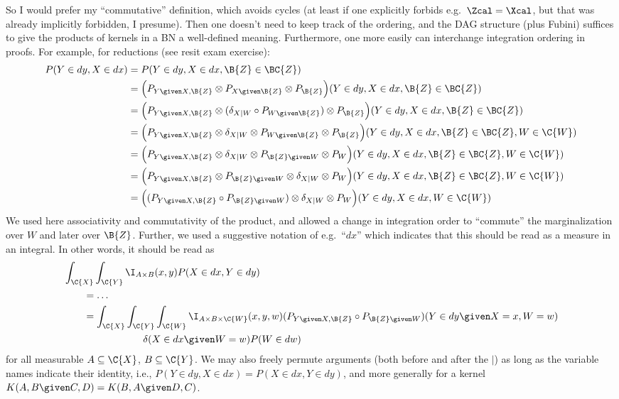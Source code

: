 So I would prefer my ``commutative'' definition, which avoids cycles (at least if one explicitly forbids e.g.\ $\Zcal = \Xcal$, but that was already implicitly forbidden, I presume).
Then one doesn't need to keep track of the ordering, and the DAG structure (plus Fubini) suffices to give the products of kernels in a BN a well-defined meaning.
Furthermore, one more easily can interchange integration ordering in proofs. For example, for reductions (see resit exam exercise):
\begin{align*}
  P(Y \in dy, X \in dx) 
  &= P(Y \in dy, X \in dx, \B{Z} \in \BC{Z}) \\
  &= \Big(P_{Y\given X,\B{Z}} \otimes P_{X\given \B{Z}} \otimes P_{\B{Z}}\Big)(Y \in dy, X \in dx, \B{Z} \in \BC{Z}) \\
  &= \Big(P_{Y\given X,\B{Z}} \otimes (\delta_{X|W} \circ P_{W\given\B{Z}}) \otimes P_{\B{Z}}\Big)(Y \in dy, X \in dx, \B{Z} \in \BC{Z}) \\
  &= \Big(P_{Y\given X,\B{Z}} \otimes \delta_{X|W} \otimes P_{W\given\B{Z}} \otimes P_{\B{Z}}\Big)(Y \in dy, X \in dx, \B{Z} \in \BC{Z}, W \in \C{W}) \\
  &= \Big(P_{Y\given X,\B{Z}} \otimes \delta_{X|W} \otimes P_{\B{Z}\given W} \otimes P_{W}\Big)(Y \in dy, X \in dx, \B{Z} \in \BC{Z}, W \in \C{W}) \\
  &= \Big(P_{Y\given X,\B{Z}} \otimes P_{\B{Z}\given W} \otimes \delta_{X|W} \otimes P_{W}\Big)(Y \in dy, X \in dx, \B{Z} \in \BC{Z}, W \in \C{W}) \\
  &= \Big((P_{Y\given X,\B{Z}} \circ P_{\B{Z}\given W}) \otimes \delta_{X|W} \otimes P_{W}\Big)(Y \in dy, X \in dx, W \in \C{W})
\end{align*}
We used here associativity and commutativity of the product, and allowed a change in integration order to ``commute'' the marginalization over $W$ and later over $\B{Z}$. Further, we used a suggestive notation of e.g.\ ``$dx$'' which indicates that this should be read as a measure in an integral. In other words, it should be read as
\begin{equation*}\begin{split}
  & \int_{\C{X}}\int_{\C{Y}} \I_{A \times B}(x,y) P(X \in dx, Y \in dy) \\ 
  &\qquad = \dots \\
  &\qquad = \int_{\C{X}}\int_{\C{Y}}\int_{\C{W}} \I_{A \times B \times \C{W}}(x,y,w) (P_{Y\given X,\B{Z}} \circ P_{\B{Z}\given W})(Y \in dy \given X=x, W=w) \\
  &\qquad\qquad\qquad\qquad \delta(X \in dx\given W=w) P(W \in dw)
\end{split}\end{equation*}
for all measurable $A \subseteq \C{X}$, $B \subseteq \C{Y}$.
We may also freely permute arguments (both before and after the $|$) as long as the variable names indicate their identity, i.e.,
$P(Y \in dy, X \in dx) = P(X \in dx, Y \in dy)$, and more generally for a kernel $K(A,B \given C,D) = K(B,A \given D,C)$.

